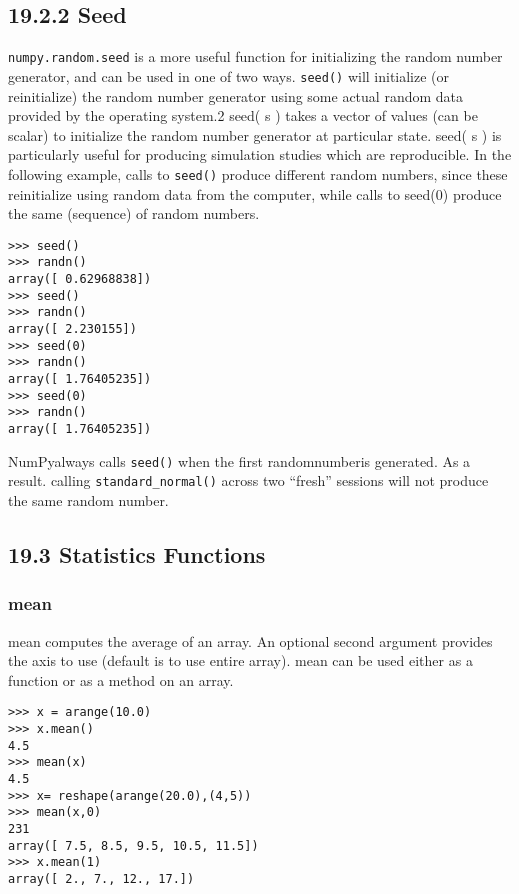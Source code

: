 \documentclass[KSmain.tex]{subfiles}
\begin{document}
\subsection{19.2.2 Seed}
\texttt{numpy.random.seed} is a more useful function for initializing the random number generator, and can be
used in one of two ways. \texttt{seed()} will initialize (or reinitialize) the random number generator using some
actual random data provided by the operating system.2 seed( s ) takes a vector of values (can be scalar) to
initialize the random number generator at particular state. seed( s ) is particularly useful for producing
simulation studies which are reproducible. In the following example, calls to \texttt{seed()} produce different
random numbers, since these reinitialize using random data from the computer, while calls to seed(0)
produce the same (sequence) of random numbers.
\begin{framed}
\begin{verbatim}
>>> seed()
>>> randn()
array([ 0.62968838])
>>> seed()
>>> randn()
array([ 2.230155])
>>> seed(0)
>>> randn()
array([ 1.76405235])
>>> seed(0)
>>> randn()
array([ 1.76405235])
\end{verbatim}
\end{framed}
NumPyalways calls \texttt{seed()}  when the first randomnumberis generated. As a result. calling \texttt{standard\_normal()}
across two “fresh” sessions will not produce the same random number.


\subsection{19.3 Statistics Functions}
\subsubsection{mean}
mean computes the average of an array. An optional second argument provides the axis to use (default is
to use entire array). mean can be used either as a function or as a method on an array.
\begin{framed}
\begin{verbatim}
>>> x = arange(10.0)
>>> x.mean()
4.5
>>> mean(x)
4.5
>>> x= reshape(arange(20.0),(4,5))
>>> mean(x,0)
231
array([ 7.5, 8.5, 9.5, 10.5, 11.5])
>>> x.mean(1)
array([ 2., 7., 12., 17.])
\end{verbatim}
\end{framed}
\end{document}

